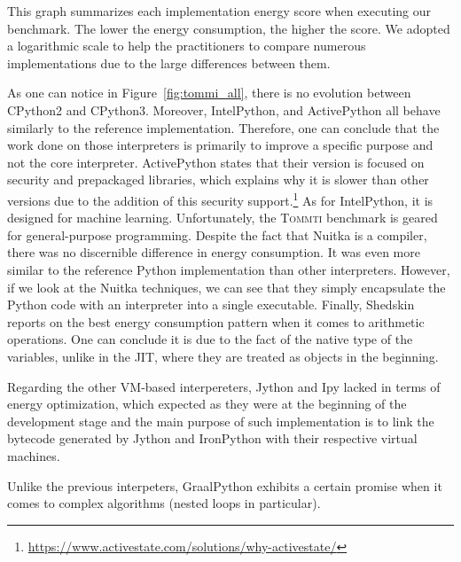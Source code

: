 This graph summarizes each implementation energy score when executing our benchmark.
The lower the energy consumption, the higher the score.
We adopted a logarithmic scale to help the practitioners to compare numerous implementations due to the large differences between them.


As one can notice in Figure~\ref{fig:tommi_all}, there is no evolution between CPython2 and CPython3.
Moreover, IntelPython, and ActivePython all behave similarly to the reference implementation.
Therefore, one can conclude that the work done on those interpreters is primarily to improve a specific purpose and not the core interpreter.
ActivePython states that their version is focused on security and prepackaged libraries, which explains why it is slower than other versions due to the addition of this security support.\footnote{\url{https://www.activestate.com/solutions/why-activestate/}}
As for IntelPython, it is designed for machine learning.
Unfortunately, the \textsc{Tommti} benchmark is geared for general-purpose programming.
Despite the fact that Nuitka is a compiler, there was no discernible difference in energy consumption.
It was even more similar to the reference Python implementation than other interpreters.
However, if we look at the Nuitka techniques, we can see that they simply encapsulate the Python code with an interpreter into a single executable.
Finally, Shedskin reports on the best energy consumption pattern when it comes to arithmetic operations.
One can conclude it is due to the fact of the native type of the variables, unlike in the JIT, where they are treated as objects in the beginning.

Regarding the other VM-based interpereters, Jython and Ipy lacked in terms of energy optimization, which expected as they were at the beginning of the development stage and the main purpose of such implementation is to link the bytecode generated by Jython and IronPython with their respective virtual machines.

Unlike the previous interpeters, GraalPython exhibits a certain promise when it comes to complex algorithms (nested loops in particular).



